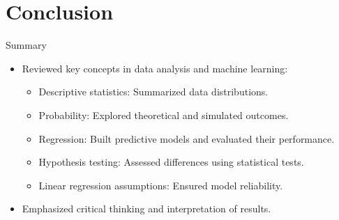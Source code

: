 \documentclass{beamer}
\begin{document}
\section{Conclusion}
\begin{frame}{Summary}
\begin{itemize}
    \item Reviewed key concepts in data analysis and machine learning:
    \begin{itemize}
        \item Descriptive statistics: Summarized data distributions.
        \item Probability: Explored theoretical and simulated outcomes.
        \item Regression: Built predictive models and evaluated their performance.
        \item Hypothesis testing: Assessed differences using statistical tests.
        \item Linear regression assumptions: Ensured model reliability.
    \end{itemize}
    \item Emphasized critical thinking and interpretation of results.
\end{itemize}
\end{frame}

\frame{\titlepage}
\end{document}
